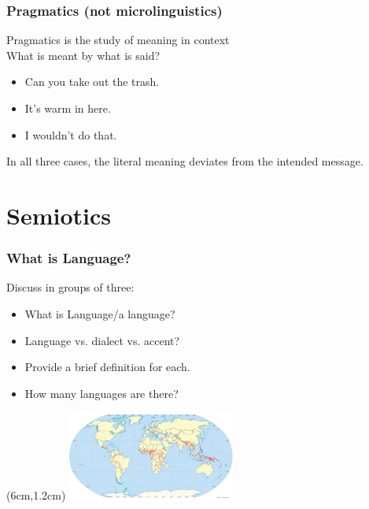 \documentclass[12pt, table]{beamer}
\begin{document}
\begin{frame}
\frametitle{Pragmatics (not microlinguistics)}
Pragmatics is the study of meaning in context\\
What is meant by what is said?
\begin{itemize}
\item Can you take out the trash.
\item It's warm in here.
\item I wouldn't do that.
\end{itemize}
In all three cases, the literal meaning deviates from the intended message.
\end{frame}

\section{Semiotics}
\begin{frame}
\frametitle{What is Language?}
Discuss in groups of three:
\begin{itemize}
\item What is Language/a language?
\item Language vs. dialect vs. accent?
\item Provide a brief definition for each.
\item How many languages are there? 
\end{itemize}
\begin{textblock*}{1.5cm}(6cm,1.2cm)
\includegraphics[width=5.5cm]{images/worldlanguages.png}
\end{textblock*}
\end{frame}
\end{document}
